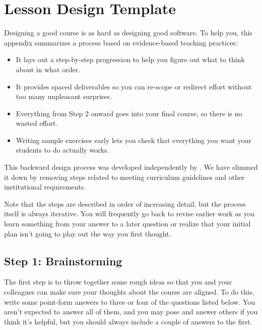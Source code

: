 \chapter{Lesson Design Template}\label{s:template}

Designing a good course is as hard as designing good software. To help
you, this appendix summarizes a process based on evidence-based teaching
practices:

\begin{itemize}
\item
  It lays out a step-by-step progression to help you figure out what
  to think about in what order.
\item
  It provides spaced deliverables so you can re-scope or redirect
  effort without too many unpleasant surprises.
\item
  Everything from Step 2 onward goes into your final course, so there
  is no wasted effort.
\item
  Writing sample exercises early lets you check that everything you
  want your students to do actually works.
\end{itemize}

This backward design process was developed independently by
\cite{Wigg2005,Bigg2011,Fink2013}. We have
slimmed it down by removing steps related to meeting curriculum
guidelines and other institutional requirements.

Note that the steps are described in order of increasing detail, but the
process itself is always iterative. You will frequently go back to
revise earlier work as you learn something from your answer to a later
question or realize that your initial plan isn't going to play out the
way you first thought.

\section{Step 1: Brainstorming}\label{step-1-brainstorming}

The first step is to throw together some rough ideas so that you and
your colleagues can make sure your thoughts about the course are
aligned. To do this, write some point-form answers to three or four of
the questions listed below. You aren't expected to answer all of them,
and you may pose and answer others if you think it's helpful, but you
should always include a couple of answers to the first.

